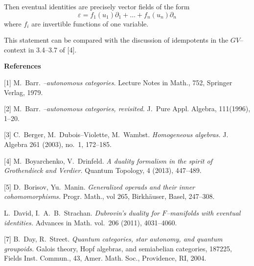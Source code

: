 {\smallskip

Then eventual identities are precisely vector fields of the form
$$
\varepsilon =  f_1(u_1)\partial_1 +\dots  +f_n(u_n)\partial_n
$$
where $f_i$ are invertible functions of one variable. 

\smallskip

This statement can be compared with the discussion of  idempotents
in the $GV$--context in 3.4--3.7 of  [4].

 
 
 
 
 
 
    
   
    
\bigskip
\centerline{\bf References }

\medskip


[1]   M.~Barr. {\it *--autonomous categories.} Lecture Notes in Math., 752, 
Springer Verlag, 1979.

\smallskip


[2]    M.~Barr. {\it *--autonomous categories, revisited.} J.~Pure Appl. Algebra, 111(1996), 1--20.



\smallskip
 
[3]   C.~Berger,  M.~Dubois--Violette, M.~Wambst. {\it Homogeneous
 algebras.} J. Algebra 261 (2003), no.~1, 172--185.
 
 


\smallskip

[4]  M.~Boyarchenko, V.~Drinfeld. {\it A duality formalism in the spirit 
 of Grothendieck and Verdier.} Quantum Topology, 4 (2013), 447--489.
 
  
 \smallskip
 
[5]     D.~Borisov, Yu.~Manin. {\it Generalized operads and their inner cohomomorphisms.}
 Progr. Math., vol 265, Birkh\"auser, Basel, 247--308.
 
 


\smallskip
[6]   L.~David, I.~A.~B.~Strachan. {\it Dubrovin's duality for $F$--manifolds
with eventual identities.} Advances in Math. vol.~206 (2011), 4031--4060.
\smallskip
 
 [7]   B.~Day, R.~Street. {\it Quantum categories, star autonomy, and quantum groupoids.}
Galois theory, Hopf algebras, and semiabelian categories, 187225, Fields Inst. 
Commun., 43, Amer. Math. Soc., Providence, RI, 2004. 

}
